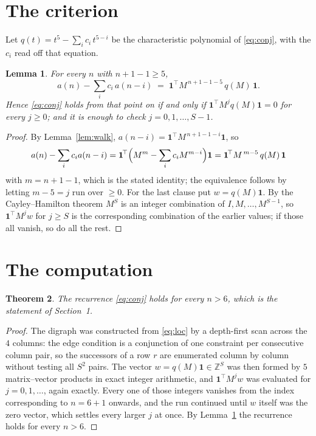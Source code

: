 \documentclass[11pt,a4paper]{article}
\theoremstyle{plain}
\newtheorem{theorem}{Theorem}
\newtheorem{lemma}[theorem]{Lemma}
\theoremstyle{definition}
\begin{document}
\section{The criterion}

Let $q(t)=t^{5}-\sum_i c_i\,t^{5-i}$ be the characteristic polynomial of
\eqref{eq:conj}, with the $c_i$ read off that equation.

\begin{lemma}\label{lem:crit}
For every $n$ with $n+1-1\ge5$,
\[
a(n)-\sum_i c_i\,a(n-i)\;=\;\mathbf{1}^{\!\top}M^{\,n+1-1-5}\,q(M)\,\mathbf{1} .
\]
Hence \eqref{eq:conj} holds from that point on if and only if
$\mathbf{1}^{\!\top}M^{j}q(M)\mathbf{1}=0$ for every $j\ge0$; and it is enough to check
$j=0,1,\dots,S-1$.
\end{lemma}

\begin{proof}
By Lemma~\ref{lem:walk}, $a(n-i)=\mathbf{1}^{\!\top}M^{\,n+1-1-i}\mathbf{1}$, so
\[
a(n)-\sum_i c_i a(n-i)
=\mathbf{1}^{\!\top}\Bigl(M^{m}-\sum_i c_i M^{m-i}\Bigr)\mathbf{1}
=\mathbf{1}^{\!\top}M^{\,m-5}\,q(M)\,\mathbf{1}
\]
with $m=n+1-1$, which is the stated identity; the equivalence follows by letting
$m-5=j$ run over $\ge0$. For the last clause put $w=q(M)\mathbf{1}$. By the
Cayley--Hamilton theorem $M^{S}$ is an integer combination of $I,M,\dots,M^{S-1}$, so
$\mathbf{1}^{\!\top}M^{j}w$ for $j\ge S$ is the corresponding combination of the earlier
values; if those all vanish, so do all the rest.
\end{proof}

\section{The computation}

\begin{theorem}
The recurrence \eqref{eq:conj} holds for every $n>6$, which is the statement of
Section~1.
\end{theorem}

\begin{proof}
The digraph was constructed from \eqref{eq:loc} by a depth-first scan across the $4$
columns: the edge condition is a conjunction of one constraint per consecutive column
pair, so the successors of a row $r$ are enumerated column by column without testing all
$S^2$ pairs. The vector $w=q(M)\mathbf{1}\in\mathbb{Z}^{S}$ was then formed by $5$
matrix--vector products in exact integer arithmetic, and $\mathbf{1}^{\!\top}M^{j}w$ was
evaluated for $j=0,1,\dots$, again exactly. Every one of those integers vanishes from the
index corresponding to $n=6+1$ onwards, and the run continued until $w$ itself was the
zero vector, which settles every larger $j$ at once. By Lemma~\ref{lem:crit} the recurrence
holds for every $n>6$.
\end{proof}
\end{document}
